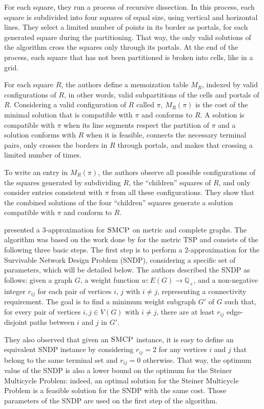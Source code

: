 For each square, they run a process of recursive dissection. In this process, each square is subdivided into four squares of equal size, using vertical and horizontal lines. They select a limited number of points in its border as portals, for each generated square during the partitioning. That way, the only valid solutions of the algorithm cross the squares only through its portals. At the end of the process, each square that has not been partitioned is broken into cells, like in a grid. 

For each square \(R\), the authors define a memoization table \(M_R\), indexed by valid configurations of \(R\), in other words, valid subpartitions of the cells and portals of \(R\). Considering a valid configuration of \(R\) called \(\pi\), \(M_R(\pi)\) is the cost of the minimal solution that is compatible with \(\pi\) and conforms to \(R\). A solution is compatible with \(\pi\) when its line segments respect the partition of \(\pi\) and a solution conforms with \(R\) when it is feasible, connects the necessary terminal pairs, only crosses the borders in \(R\) through portals, and makes that crossing a limited number of times.

To write an entry in \(M_R(\pi)\), the authors observe all possible configurations of the squares generated by subdividing \(R\), the ``children'' squares of \(R\), and only consider entries consistent with \(\pi\) from all these configurations. They show that the combined solutions of the four ``children'' squares generate a solution compatible with \(\pi\) and conform to \(R\).

\cite{smcp_3apx} presented a 3-approximation for \(\textsc{SMCP}\) on metric and complete graphs. The algorithm was based on the work done by \cite{Christofides2022WorstCaseAO} for the metric TSP and consists of the following three basic steps.
The first step is to perform a 2-approximation for the Survivable Network Design Problem (SNDP), considering a specific set of parameters, which will be detailed below. The authors described the SNDP as follows: given a graph \(G\), a weight function \(w: E(G) \rightarrow \mathbb{Q}_+\), and a non-negative integer \(r_{ij}\) for each pair of vertices \(i\), \(j\) with \(i \neq j\), representing a connectivity requirement. The goal is to find a minimum weight subgraph \(G'\) of \(G\) such that, for every pair of vertices \(i, j \in V(G)\) with \(i \neq j\), there are at least \(r_{ij}\) edge-disjoint paths between \(i\) and \(j\) in \(G'\).

They also observed that given an \(\textsc{SMCP}\) instance, it is easy to define an equivalent SNDP instance by considering \(r_{ij} = 2\) for any vertices \(i\) and \(j\) that belong to the same terminal set and \(r_{ij} = 0\) otherwise. That way, the optimum value of the SNDP is also a lower bound on the optimum for the Steiner Multicycle Problem: indeed, an optimal solution for the Steiner Multicycle Problem is a feasible solution for the SNDP with the same cost. Those parameters of the SNDP are used on the first step of the algorithm.

